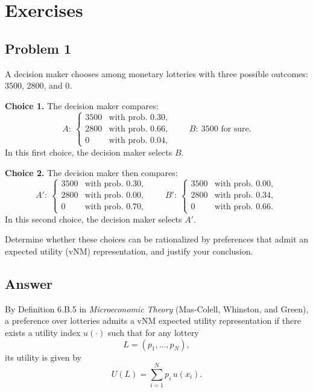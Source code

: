 \documentclass[12pt]{article}
\begin{document}
\section*{Exercises}

\subsection*{Problem 1}
A decision maker chooses among monetary lotteries with three possible outcomes: $3500$, $2800$, and $0$.

\medskip

\noindent \textbf{Choice 1.} The decision maker compares:
\[
A:\ 
\begin{cases}
3500 & \text{with prob.\ } 0.30,\\
2800 & \text{with prob.\ } 0.66,\\
0    & \text{with prob.\ } 0.04,
\end{cases}
\qquad
B:\ 3500 \text{ for sure.}
\]
In this first choice, the decision maker selects $B$.

\medskip

\noindent \textbf{Choice 2.} The decision maker then compares:
\[
A':\
\begin{cases}
3500 & \text{with prob.\ } 0.30,\\
2800 & \text{with prob.\ } 0.00,\\
0    & \text{with prob.\ } 0.70,
\end{cases}
\qquad
B':\
\begin{cases}
3500 & \text{with prob.\ } 0.00,\\
2800 & \text{with prob.\ } 0.34,\\
0    & \text{with prob.\ } 0.66.
\end{cases}
\]
In this second choice, the decision maker selects $A'$.

\medskip

Determine whether these choices can be rationalized by preferences that admit an expected utility (vNM) representation, and justify your conclusion.

\subsection*{Answer}
By Definition 6.B.5 in \emph{Microeconomic Theory} (Mas-Colell, Whinston, and Green), a preference over lotteries admits a vNM expected utility representation if there exists a utility index $u(\cdot)$ such that for any lottery
\[
L=(p_1,\dots,p_N),
\]
its utility is given by
\[
U(L)=\sum_{i=1}^{N} p_i\,u(x_i).
\]
\end{document}
